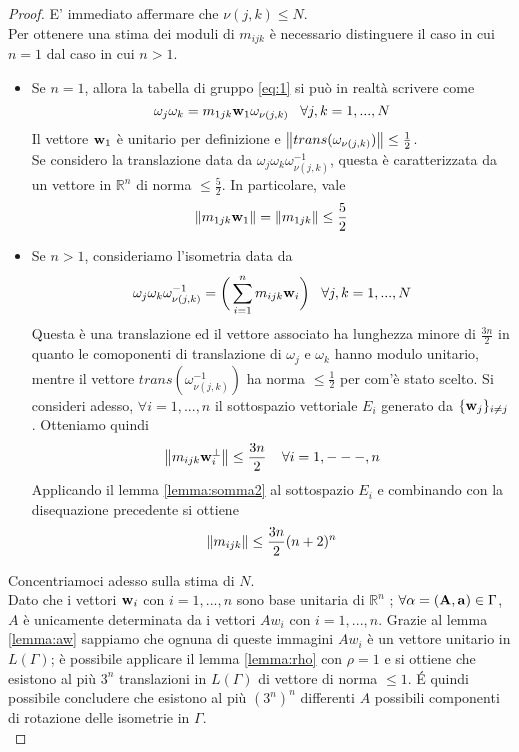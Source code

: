\documentclass[a4paper,11pt,openright,twoside	]{book}
\begin{document}
\begin{proof}
E' immediato affermare che $\nu (j,k) \leq N$. \\
Per ottenere una stima dei moduli di $m_{ijk}$ è necessario distinguere il caso in cui $n = 1$ dal caso in cui $n > 1$. \\
\begin{itemize}
\item Se $n = 1$, allora la tabella di gruppo \ref{eq:1} si può in realtà scrivere come 
\[ \omega_j \omega_k =  m_{1jk} \vb{w}_1 \omega_{\nu (j,k)}      \; \; \; \forall j,k =1, ...,N \]
Il vettore $\vb{w}_1$ è unitario per definizione e $\norm{ trans(\omega_{\nu (j,k)} ) } \leq \frac{1}{2}$. \\
Se considero la translazione data da $\omega_j \omega_k \omega_{\nu (j,k)}^{-1}$, questa è caratterizzata da un vettore in $\mathbb{R}^n$ di norma $\leq \frac{5}{2}$. In particolare, vale 
\[ \norm{m_{1jk} \vb{w}_1 } =  \norm{m_{1jk}} \leq \frac{5}{2} \] 
\item Se $n>1$, consideriamo l'isometria data da 
\[  \omega_j \omega_k \omega^{-1}_{\nu (j,k)} = \bigg( \sum_{i = 1}^{n} m_{ijk} \vb{w}_i\bigg)      \; \; \; \forall j,k =1, ...,N \]
Questa è una translazione ed il vettore associato ha lunghezza minore di $ \frac{3n}{2}$ in quanto le comoponenti di translazione di $\omega_j$ e $  \omega_k $  hanno modulo unitario, mentre il vettore $trans(\omega^{-1}_{\nu (j,k)}) $ ha norma $\leq \frac{1}{2}$  per com'è stato scelto. 
Si consideri adesso, $\forall i = 1,...,n$ il sottospazio vettoriale $E_i$ generato da $ \{ \vb{w}_j \}_{i \neq j}$. Otteniamo quindi 
\begin{equation}
\label{eq:mijk}
\norm{m_{ijk} \vb{w}_i^{\perp}}  \leq \frac{3n}{2} \; \; \; \; \forall i = 1, ---, n
\end{equation}
Applicando il lemma \ref{lemma:somma2} al sottospazio $E_i$ e combinando con la disequazione precedente si ottiene 
\begin{equation}
\norm{m_{ijk} } \leq \frac{3n}{2} (n+2)^{n}
\end{equation}
\end{itemize}
Concentriamoci adesso sulla stima di $N$. \\
Dato che i vettori $\vb{w}_i $ con $i=1,...,n$ sono base unitaria di $\mathbb{R}^n$ ;  $ \forall \alpha  = (\vb{A,a}) \in \Gamma$, $A$ è unicamente determinata da i vettori $Aw_i$ con $i=1,...,n$. Grazie al lemma \ref{lemma:aw} sappiamo che ognuna di queste immagini $Aw_i$ è un vettore unitario in $L(\Gamma)$; è possibile applicare il lemma \ref{lemma:rho} con $\rho = 1$ e si ottiene  che esistono al più $3^n$ translazioni in $L(\Gamma)$ di vettore di norma $\leq 1$. \'E quindi possibile concludere che esistono al più $(3^n)^n$ differenti $A$ possibili componenti di rotazione delle isometrie in $\Gamma$. \\

\end{proof}
\end{document}
